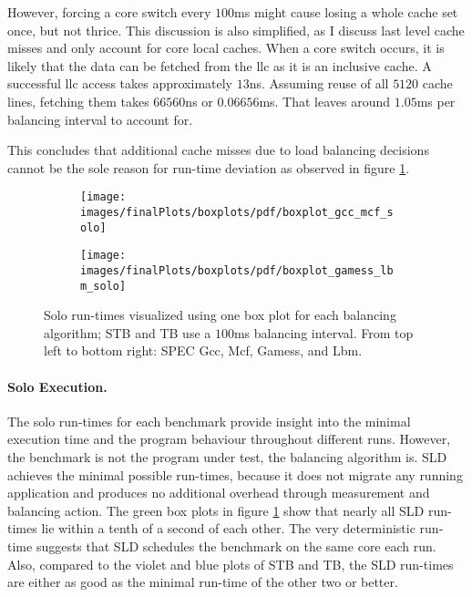 However, forcing a core switch every $100$ms might cause losing a whole cache set
once, but not thrice.
This discussion is also simplified, as I discuss last level cache misses
and only account for core local caches.
When a core switch occurs, it is likely that the data can be fetched from the
\gls{llc} as it is an inclusive cache.
A successful \gls{llc} access takes approximately $13$ns.
Assuming reuse of all $5120$ cache lines, fetching them takes $66560$ns or
$0.06656$ms.
That leaves around $1.05$ms per balancing interval to account for.

This concludes that additional cache misses due to load balancing decisions cannot
be the sole reason for run-time deviation as observed in figure
\ref{eval:fig:box_solo}.

\begin{figure}[!ht]
  \begin{subfigure}{\textwidth}
  \texttt{[image: images/finalPlots/boxplots/pdf/boxplot\_gcc\_mcf\_solo]}
  \end{subfigure}
  \begin{subfigure}{\textwidth}
  \texttt{[image: images/finalPlots/boxplots/pdf/boxplot\_gamess\_lbm\_solo]}
  \end{subfigure}
  \caption{Solo run-times visualized using one box plot for each balancing
    algorithm; STB and TB use a $100$ms balancing interval.
    From top left to bottom right: SPEC Gcc, Mcf, Gamess, and Lbm.}
  \label{eval:fig:box_solo}
\end{figure}

\paragraph{Solo Execution.}
The solo run-times for each benchmark provide insight into the minimal
execution time and the program behaviour throughout different runs.
However, the benchmark is not the program under test, the balancing algorithm
is.
SLD achieves the minimal possible run-times, because it does not
migrate any running application and produces no additional overhead through
measurement and balancing action.
The green box plots in figure \ref{eval:fig:box_solo} show that nearly all SLD
run-times lie within a tenth of a second of each other.
The very deterministic run-time suggests that SLD schedules the benchmark on
the same core each run.
Also, compared to the violet and blue plots of STB and TB, the SLD run-times
are either as good as the minimal run-time of the other two or better.



